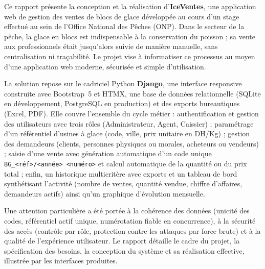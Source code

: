 Ce rapport présente la conception et la réalisation d'\textbf{IceVentes}, une application web de gestion des ventes de blocs de glace développée au cours d'un stage effectué au sein de l'Office National des Pêches (ONP). Dans le secteur de la pêche, la glace en blocs est indispensable à la conservation du poisson ; sa vente aux professionnels était jusqu'alors suivie de manière manuelle, sans centralisation ni traçabilité. Le projet vise à informatiser ce processus au moyen d'une application web moderne, sécurisée et simple d'utilisation.

La solution repose sur le cadriciel Python \textbf{Django}, une interface responsive construite avec Bootstrap~5 et HTMX, une base de données relationnelle (SQLite en développement, PostgreSQL en production) et des exports bureautiques (Excel, PDF). Elle couvre l'ensemble du cycle métier : authentification et gestion des utilisateurs avec trois rôles (Administrateur, Agent, Caissier) ; paramétrage d'un référentiel d'usines à glace (code, ville, prix unitaire en DH/Kg) ; gestion des demandeurs (clients, personnes physiques ou morales, acheteurs ou vendeurs) ; saisie d'une vente avec génération automatique d'un code unique \texttt{BG\_<réf>/<année> <numéro>} et calcul automatique de la quantité ou du prix total ; enfin, un historique multicritère avec exports et un tableau de bord synthétisant l'activité (nombre de ventes, quantité vendue, chiffre d'affaires, demandeurs actifs) ainsi qu'un graphique d'évolution mensuelle.

Une attention particulière a été portée à la cohérence des données (unicité des codes, référentiel actif unique, numérotation fiable en concurrence), à la sécurité des accès (contrôle par rôle, protection contre les attaques par force brute) et à la qualité de l'expérience utilisateur. Le rapport détaille le cadre du projet, la spécification des besoins, la conception du système et sa réalisation effective, illustrée par les interfaces produites.
